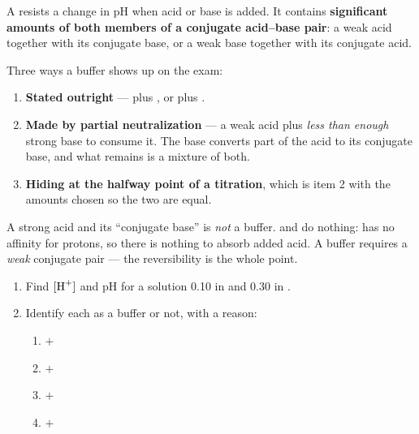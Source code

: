 \documentclass{apchem-notes}
\begin{document}


A  resists a change in pH when acid or base is
added. It contains \textbf{significant amounts of both members of a
conjugate acid--base pair}: a weak acid together with its conjugate base, or
a weak base together with its conjugate acid.

Three ways a buffer shows up on the exam:

\begin{enumerate}[leftmargin=*,itemsep=0.3em]
  \item \textbf{Stated outright} ---  plus , or
         plus .
  \item \textbf{Made by partial neutralization} --- a weak acid plus
        \emph{less than enough} strong base to consume it. The base
        converts part of the acid to its conjugate base, and what remains is
        a mixture of both.
  \item \textbf{Hiding at the halfway point of a titration}, which is item 2
        with the amounts chosen so the two are equal.
\end{enumerate}

\begin{apctrap}
A strong acid and its ``conjugate base'' is \emph{not} a buffer.
 and  do nothing:  has no affinity for protons, so
there is nothing to absorb added acid. A buffer requires a \emph{weak}
conjugate pair --- the reversibility is the whole point.
\end{apctrap}


\begin{enumerate}[leftmargin=*,itemsep=0.4em]
  \item Find $[\ce{H+}]$ and pH for a solution \SI{0.10}{\Molar} in 
        and \SI{0.30}{\Molar} in . \workspace[2.4cm]
  \item Identify each as a buffer or not, with a reason:
        \begin{enumerate}[leftmargin=1.4em,itemsep=0.25em]
          \item {} $+$ 
          \item {} $+$ 
          \item {} $+$ 
          \item {} $+$ 
        \end{enumerate}
\end{enumerate}
\end{document}
